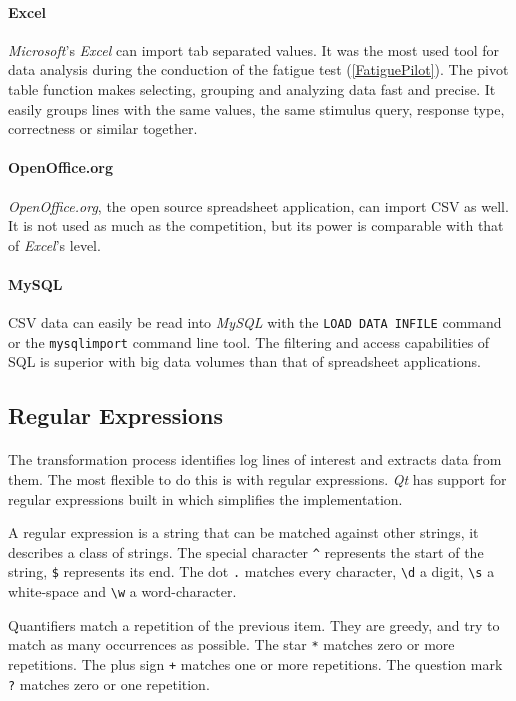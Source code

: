 \paragraph{Excel}
\textit{Microsoft}'s \textit{Excel} can import tab separated values.
It was the most used tool for data analysis during the conduction of the fatigue test (\ref{FatiguePilot}).
The pivot table function makes selecting, grouping and analyzing data fast and precise.
It easily groups lines with the same values, the same stimulus query, response type, correctness or similar together.

\paragraph{OpenOffice.org}
\textit{OpenOffice.org}, the open source spreadsheet application, can import CSV as well.
It is not used as much as the competition, but its power is comparable with that of \textit{Excel}'s level.

\paragraph{MySQL}
CSV data can easily be read into \textit{MySQL} with the \texttt{LOAD DATA INFILE} command or the \texttt{mysqlimport} command line tool.
The filtering and access capabilities of SQL is superior with big data volumes than that of spreadsheet applications.


\subsection{Regular Expressions}
\paragraph{}
The transformation process identifies log lines of interest and extracts data from them.
The most flexible to do this is with regular expressions.
\textit{Qt} has support for regular expressions built in which simplifies the implementation.

A regular expression is a string that can be matched against other strings, it describes a class of strings.
The special character \texttt{\^} represents the start of the string, \texttt{\$} represents its end.
The dot \texttt{.} matches every character, \texttt{\textbackslash d} a digit, \texttt{\textbackslash s} a white-space and \texttt{\textbackslash w} a word-character.

Quantifiers match a repetition of the previous item.
They are greedy, and try to match as many occurrences as possible.
The star \texttt{*} matches zero or more repetitions.
The plus sign \texttt{+} matches one or more repetitions.
The question mark \texttt{?} matches zero or one repetition.

